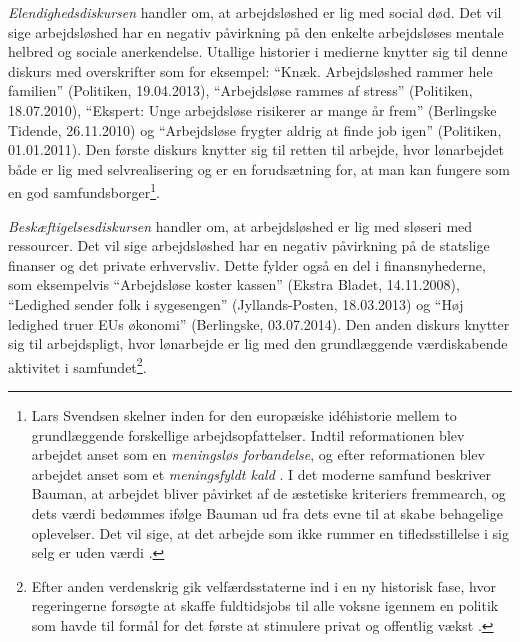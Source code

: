 \textit{Elendighedsdiskursen} handler om, at arbejdsløshed er lig med social død. Det vil sige arbejdsløshed har en negativ påvirkning på den enkelte arbejdsløses mentale helbred og sociale anerkendelse. Utallige historier i medierne knytter sig til denne diskurs med overskrifter som for eksempel: “Knæk. Arbejdsløshed rammer hele familien” (Politiken, 19.04.2013), “Arbejdsløse rammes af stress” (Politiken, 18.07.2010), “Ekspert: Unge arbejdsløse risikerer ar mange år frem” (Berlingske Tidende, 26.11.2010) og “Arbejdsløse frygter aldrig at finde job igen” (Politiken, 01.01.2011).
Den første diskurs knytter sig til retten til arbejde, hvor lønarbejdet både er lig med selvrealisering og er en forudsætning for, at man kan fungere som en god samfundsborger\footnote{Lars Svendsen skelner inden for den europæiske idéhistorie mellem to grundlæggende forskellige arbejdsopfattelser. Indtil reformationen blev arbejdet anset som en \textit{meningsløs forbandelse}, og efter reformationen blev arbejdet anset som et \textit{meningsfyldt kald} \parencite[13]{Svendsen2008}.
I det moderne samfund beskriver Bauman, at arbejdet bliver påvirket af de æstetiske kriteriers fremmearch, og dets værdi bedømmes ifølge Bauman ud fra dets evne til at skabe behagelige oplevelser. Det vil sige, at det arbejde som ikke rummer en tifledsstillelse i sig selg er uden værdi \textbf{\parencite[169-215]{Baum2006}}.}. %

\textit{Beskæftigelsesdiskursen} handler om, at arbejdsløshed er lig med sløseri med ressourcer. Det vil sige arbejdsløshed har en negativ påvirkning på de statslige finanser og det private erhvervsliv. Dette fylder også en del i finansnyhederne, som eksempelvis “Arbejdsløse koster kassen” (Ekstra Bladet, 14.11.2008), “Ledighed sender folk i sygesengen” (Jyllands-Posten, 18.03.2013) og “Høj ledighed truer EUs økonomi” (Berlingske, 03.07.2014).
Den anden diskurs knytter sig til arbejdspligt, hvor lønarbejde er lig med den grundlæggende værdiskabende aktivitet i samfundet\footnote{Efter anden verdenskrig gik velfærdsstaterne ind i en ny historisk fase, hvor regeringerne forsøgte at skaffe fuldtidsjobs til alle voksne igennem en politik som havde til formål for det første at stimulere privat og offentlig vækst \parencite[17]{Keane1986}.}. %

